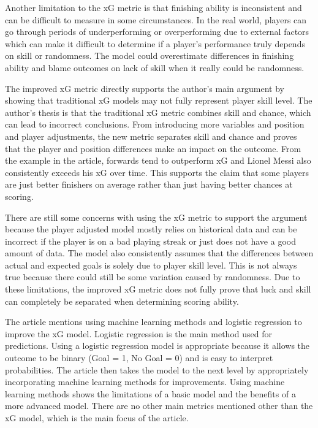 \documentclass[
  11pt,
  letterpaper,
  DIV=11,
  numbers=noendperiod]{scrartcl}
\begin{document}
Another limitation to the xG metric is that finishing ability is
inconsistent and can be difficult to measure in some circumstances. In
the real world, players can go through periods of underperforming or
overperforming due to external factors which can make it difficult to
determine if a player's performance truly depends on skill or
randomness. The model could overestimate differences in finishing
ability and blame outcomes on lack of skill when it really could be
randomness.

The improved xG metric directly supports the author's main argument by
showing that traditional xG models may not fully represent player skill
level. The author's thesis is that the traditional xG metric combines
skill and chance, which can lead to incorrect conclusions. From
introducing more variables and position and player adjustments, the new
metric separates skill and chance and proves that the player and
position differences make an impact on the outcome. From the example in
the article, forwards tend to outperform xG and Lionel Messi also
consistently exceeds his xG over time. This supports the claim that some
players are just better finishers on average rather than just having
better chances at scoring.

There are still some concerns with using the xG metric to support the
argument because the player adjusted model mostly relies on historical
data and can be incorrect if the player is on a bad playing streak or
just does not have a good amount of data. The model also consistently
assumes that the differences between actual and expected goals is solely
due to player skill level. This is not always true because there could
still be some variation caused by randomness. Due to these limitations,
the improved xG metric does not fully prove that luck and skill can
completely be separated when determining scoring ability.

The article mentions using machine learning methods and logistic
regression to improve the xG model. Logistic regression is the main
method used for predictions. Using a logistic regression model is
appropriate because it allows the outcome to be binary (Goal = 1, No
Goal = 0) and is easy to interpret probabilities. The article then takes
the model to the next level by appropriately incorporating machine
learning methods for improvements. Using machine learning methods shows
the limitations of a basic model and the benefits of a more advanced
model. There are no other main metrics mentioned other than the xG
model, which is the main focus of the article.
\end{document}
